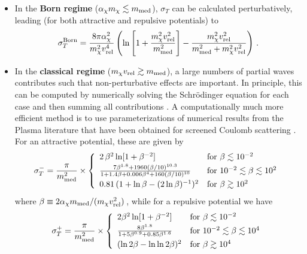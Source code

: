 \documentclass[a4paper,10pt,oneside]{book}
\begin{document}
\begin{itemize}
	\item In the \textbf{{Born} regime}  ($\alpha_\chi m_\chi \lesssim m_{\rm med}$), $\sigma_T$ 
	can be calculated perturbatively, leading (for both attractive and repulsive potentials) to~\cite{Feng:2009hw}
	\begin{equation}
	\sigma_T^{\rm Born} = \frac{8\pi \alpha_\chi^2}{m^2_\chi v^4_{\rm rel}} \left( \ln \left[1+\frac{m^2_\chi v^2_{\rm rel}}{m^2_{\rm med}} \right]-\frac{m^2_\chi v^2_{\rm rel}}{m^2_{\rm med}+m^2_\chi v^2_{\rm rel}}\right)\,.
	\label{sigmatborn}
	\end{equation}

	\item In the 
	\textbf{{classical} regime} ($m_\chi v_{\rm rel} \gtrsim m_{\rm med}$), a large numbers of partial waves
	contributes such that non-perturbative effects are important. In principle, this can be computed by numerically 
	solving the Schr\"odinger equation for each case and then summing all contributions  \cite{Tulin:2013teo}.
         A computationally much more efficient method is to use parameterizations \cite{Cyr-Racine:2015ihg} of 
         numerical results from the Plasma literature that have been obtained for screened Coulomb 
         scattering \cite{Khrapak:2003kjw,PhysRevE.70.056405}. For an attractive potential, these are given by
\smallskip         
	\begin{eqnarray}
	\sigma_T^{\mathbf{-}}= \frac{\pi}{m_{\rm med}^2}\times 
\left\{
    \begin{array}{ll}        
    2\, \beta^2 \ln[1+\beta^{-2}] & \textrm{for } \beta \lesssim 10^{-2} \\[0.5ex]
     \frac{7\beta^{1.8} +1960 (\beta/10)^{10.3}}{1+1.4\beta +0.006 \beta^4 +160(\beta/10)^{10}} & \textrm{for } 10^{-2} \lesssim \beta \lesssim 10^2\\[1ex]
                     0.81\,(1+\ln \beta -(2\ln\beta)^{-1})^2 & \textrm{for }  \beta \gtrsim 10^2  
 \end{array}
 \right.
 \label{sigmatclassicalattractive}
	\end{eqnarray}
\smallskip         
	where $\beta\equiv 2\alpha_\chi m_{\rm med}/(m_\chi v^2_{\rm rel})$\,, while for a repulsive potential we have 
\smallskip         
	\begin{eqnarray}
	\sigma_T^{\mathbf{+}}= \frac{\pi}{m_{\rm med}^2}\times 
\left\{
    \begin{array}{ll}        
  2\beta^2 \ln [1+\beta^{-2}] & \textrm{for } \beta \lesssim 10^{-2} \\[0.5ex]
    \frac{8\beta^{1.8}}{1+5\beta^{0.9} +0.85 \beta^{1.6}} & \textrm{for } 10^{-2} \lesssim \beta \lesssim 10^4\\[1ex]
	(\ln 2\beta -\ln\ln2\beta)^2 & \textrm{for } \beta \gtrsim 10^4
 \end{array}
 \right.
 \label{sigmatclassicalrepulsive}
	\end{eqnarray}
\smallskip         


\end{itemize}
\end{document}
